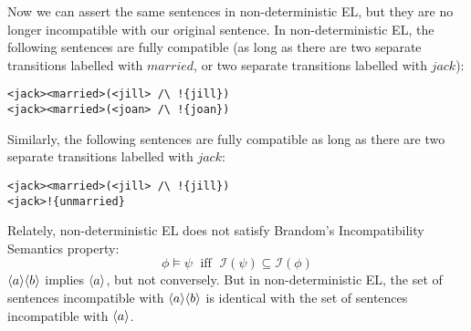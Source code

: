 Now we can assert the same sentences in non-deterministic EL, but they are no longer incompatible with our original sentence.
In non-deterministic EL, the following sentences are fully compatible (as long as there are two separate transitions labelled with $married$, or two separate transitions labelled with $jack$):
\begin{verbatim}
<jack><married>(<jill> /\ !{jill})
<jack><married>(<joan> /\ !{joan})
\end{verbatim}
Similarly, the following sentences are fully compatible as long as there are two separate transitions labelled with $jack$:
\begin{verbatim}
<jack><married>(<jill> /\ !{jill})
<jack>!{unmarried}
\end{verbatim}

Relately, non-deterministic EL does not satisfy Brandom's Incompatibility Semantics property:
\[
\phi \models \psi \; \mbox{ iff } \; \mathcal{I}(\psi) \subseteq \mathcal{I}(\phi)
\]
$\MAY{a}\MAY{b}$ implies $\MAY{a}$, but not conversely.
But in non-deterministic EL, the set of sentences incompatible with $\MAY{a}\MAY{b}$ is identical with the set of sentences incompatible with  $\MAY{a}$.




